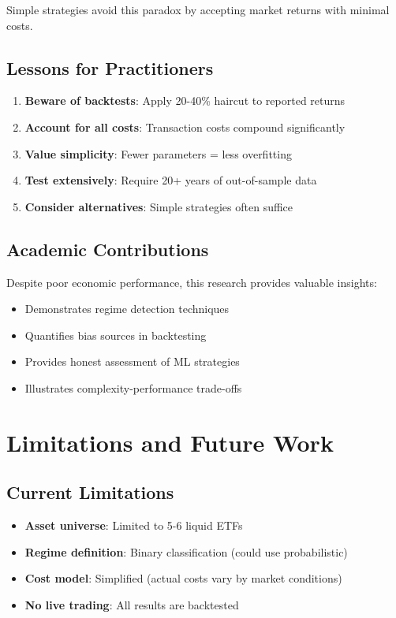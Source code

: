\documentclass[twocolumn,ieee]{arithmaxresearch}
\begin{document}
Simple strategies avoid this paradox by accepting market returns with minimal costs.

\subsection{Lessons for Practitioners}

\begin{enumerate}
    \item \textbf{Beware of backtests}: Apply 20-40\% haircut to reported returns
    \item \textbf{Account for all costs}: Transaction costs compound significantly
    \item \textbf{Value simplicity}: Fewer parameters = less overfitting
    \item \textbf{Test extensively}: Require 20+ years of out-of-sample data
    \item \textbf{Consider alternatives}: Simple strategies often suffice
\end{enumerate}

\subsection{Academic Contributions}

Despite poor economic performance, this research provides valuable insights:

\begin{itemize}
    \item Demonstrates regime detection techniques
    \item Quantifies bias sources in backtesting
    \item Provides honest assessment of ML strategies
    \item Illustrates complexity-performance trade-offs
\end{itemize}

\section{Limitations and Future Work}

\subsection{Current Limitations}

\begin{itemize}
    \item \textbf{Asset universe}: Limited to 5-6 liquid ETFs
    \item \textbf{Regime definition}: Binary classification (could use probabilistic)
    \item \textbf{Cost model}: Simplified (actual costs vary by market conditions)
    \item \textbf{No live trading}: All results are backtested
\end{itemize}
\end{document}
